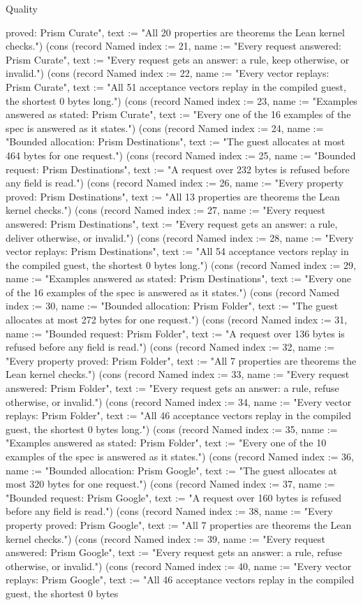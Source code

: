 \begin{lexlean}{Quality}
\begin{semanticmodule}
{proved: Prism Curate", text := "All 20 properties are theorems the Lean kernel checks."}) (cons (record Named {index := 21, name := "Every request answered: Prism Curate", text := "Every request gets an answer: a rule, keep otherwise, or invalid."}) (cons (record Named {index := 22, name := "Every vector replays: Prism Curate", text := "All 51 acceptance vectors replay in the compiled guest, the shortest 0 bytes long."}) (cons (record Named {index := 23, name := "Examples answered as stated: Prism Curate", text := "Every one of the 16 examples of the spec is answered as it states."}) (cons (record Named {index := 24, name := "Bounded allocation: Prism Destinations", text := "The guest allocates at most 464 bytes for one request."}) (cons (record Named {index := 25, name := "Bounded request: Prism Destinations", text := "A request over 232 bytes is refused before any field is read."}) (cons (record Named {index := 26, name := "Every property proved: Prism Destinations", text := "All 13 properties are theorems the Lean kernel checks."}) (cons (record Named {index := 27, name := "Every request answered: Prism Destinations", text := "Every request gets an answer: a rule, deliver otherwise, or invalid."}) (cons (record Named {index := 28, name := "Every vector replays: Prism Destinations", text := "All 54 acceptance vectors replay in the compiled guest, the shortest 0 bytes long."}) (cons (record Named {index := 29, name := "Examples answered as stated: Prism Destinations", text := "Every one of the 16 examples of the spec is answered as it states."}) (cons (record Named {index := 30, name := "Bounded allocation: Prism Folder", text := "The guest allocates at most 272 bytes for one request."}) (cons (record Named {index := 31, name := "Bounded request: Prism Folder", text := "A request over 136 bytes is refused before any field is read."}) (cons (record Named {index := 32, name := "Every property proved: Prism Folder", text := "All 7 properties are theorems the Lean kernel checks."}) (cons (record Named {index := 33, name := "Every request answered: Prism Folder", text := "Every request gets an answer: a rule, refuse otherwise, or invalid."}) (cons (record Named {index := 34, name := "Every vector replays: Prism Folder", text := "All 46 acceptance vectors replay in the compiled guest, the shortest 0 bytes long."}) (cons (record Named {index := 35, name := "Examples answered as stated: Prism Folder", text := "Every one of the 10 examples of the spec is answered as it states."}) (cons (record Named {index := 36, name := "Bounded allocation: Prism Google", text := "The guest allocates at most 320 bytes for one request."}) (cons (record Named {index := 37, name := "Bounded request: Prism Google", text := "A request over 160 bytes is refused before any field is read."}) (cons (record Named {index := 38, name := "Every property proved: Prism Google", text := "All 7 properties are theorems the Lean kernel checks."}) (cons (record Named {index := 39, name := "Every request answered: Prism Google", text := "Every request gets an answer: a rule, refuse otherwise, or invalid."}) (cons (record Named {index := 40, name := "Every vector replays: Prism Google", text := "All 46 acceptance vectors replay in the compiled guest, the shortest 0 bytes }
\end{semanticmodule}
\end{lexlean}
